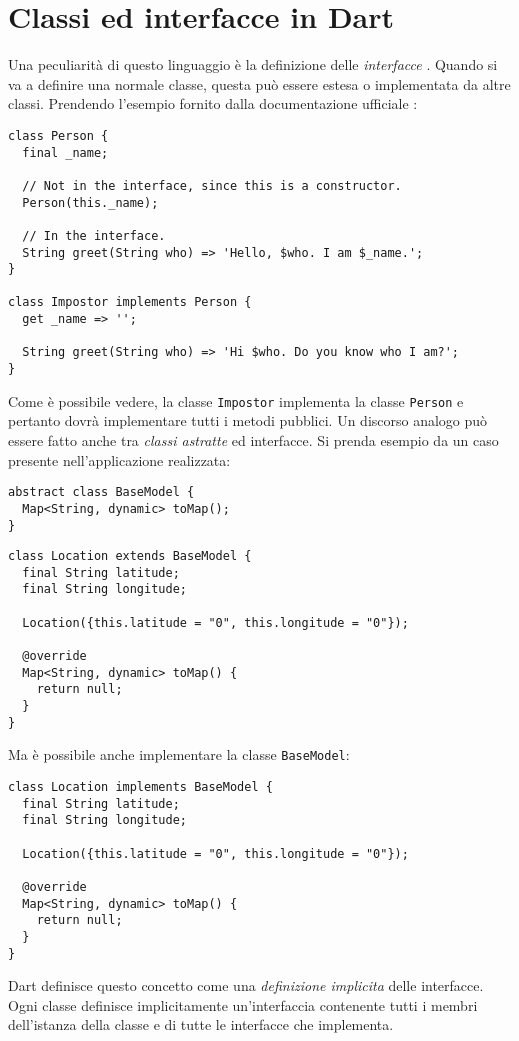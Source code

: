 \chapter{Classi ed interfacce in Dart}
\label{cap:A}
Una peculiarità di questo linguaggio è la definizione delle \textit{interfacce} \cite{implicit_interfaces}. Quando si va a definire una normale classe, questa può essere estesa o implementata da altre classi.
Prendendo l'esempio fornito dalla documentazione ufficiale \cite{implicit_interfaces}:
\begin{lstlisting}
class Person {
  final _name;

  // Not in the interface, since this is a constructor.
  Person(this._name);

  // In the interface.
  String greet(String who) => 'Hello, $who. I am $_name.';
}

class Impostor implements Person {
  get _name => '';

  String greet(String who) => 'Hi $who. Do you know who I am?';
}
\end{lstlisting}

Come è possibile vedere, la classe \verb|Impostor| implementa la classe \verb|Person| e pertanto dovrà implementare tutti i metodi pubblici. Un discorso analogo può essere fatto anche tra \textit{classi astratte} ed interfacce. Si prenda esempio da un caso presente nell'applicazione realizzata:
\begin{lstlisting}
abstract class BaseModel {
  Map<String, dynamic> toMap();
}
\end{lstlisting}

\begin{lstlisting}
class Location extends BaseModel {
  final String latitude;
  final String longitude;

  Location({this.latitude = "0", this.longitude = "0"});

  @override
  Map<String, dynamic> toMap() {
    return null;
  }
}
\end{lstlisting}

Ma è possibile anche implementare la classe \verb|BaseModel|:
\begin{lstlisting}
class Location implements BaseModel {
  final String latitude;
  final String longitude;

  Location({this.latitude = "0", this.longitude = "0"});

  @override
  Map<String, dynamic> toMap() {
    return null;
  }
}
\end{lstlisting}

Dart definisce questo concetto come una \textit{definizione implicita} delle interfacce. Ogni classe definisce implicitamente un'interfaccia contenente tutti i membri dell'istanza della classe e di tutte le interfacce che implementa.